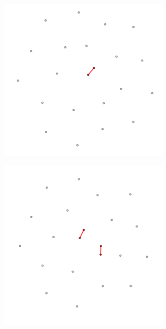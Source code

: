 \begin{figure}[!htbp]
    \centering
    \begin{subfigure}{0.3\textwidth}
        \centering
        \includegraphics[width=0.92\textwidth]{figures/temporal/0.png}
        \caption{}
        \label{fig:temporal net A}
    \end{subfigure}
    \hfill
    \begin{subfigure}{0.3\textwidth}
        \centering
        \includegraphics[width=0.92\textwidth]{figures/temporal/1.png}

\end{subfigure}
\end{figure}
